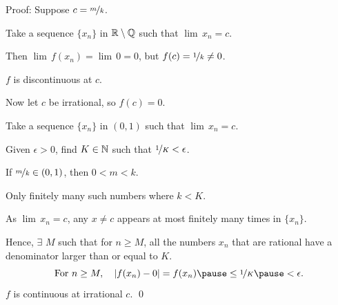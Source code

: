 \documentclass[10pt,aspectratio=169]{beamer}
\begin{document}
\begin{frame}

Proof:
Suppose $c = \nicefrac{m}{k}$.

\pause
Take a sequence $\{ x_n \}$ in ${\mathbb{R}} \setminus {\mathbb{Q}}$ such that $\lim\, x_n = c$.

\pause
Then $\lim\, f(x_n) = \lim \, 0 = 0$, but $f(c) = \nicefrac{1}{k} \not= 0$.

\pause
\thus \quad $f$ is discontinuous at $c$.

\pause
\medskip

Now let $c$ be irrational, so $f(c) = 0$.

\pause
Take a sequence $\{ x_n \}$ in $(0,1)$ such that $\lim\, x_n = c$.

\pause
Given $\epsilon > 0$, find $K \in {\mathbb{N}}$ such that $\nicefrac{1}{K} < \epsilon$.

\pause
If $\nicefrac{m}{k} \in (0,1)$, then $0 < m < k$.

\pause
Only finitely many such numbers where $k < K$.

\pause
As $\lim\, x_n = c$, any $x \not= c$ appears at most
finitely many times in $\{ x_n \}$.

\pause
Hence,
$\exists$ $M$ such that for $n \geq M$, all the numbers $x_n$
that are rational
have a denominator larger than or equal to $K$.
\pause
\begin{equation*}
\text{For } n \geq M, \quad
\abs{f(x_n) - 0} = f(x_n)
\pause
\leq \nicefrac{1}{K}
\pause
< \epsilon .
\end{equation*}
\pause
\thus \quad $f$ is continuous at irrational $c$.
\qed

\end{frame}
\end{document}
